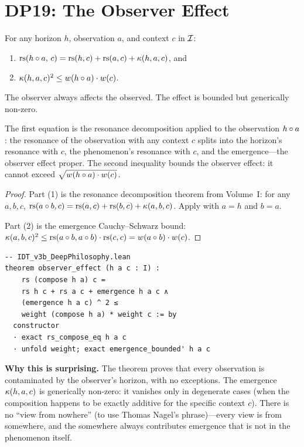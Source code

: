 \section{DP19: The Observer Effect}

\begin{theorem}
\label{thm:observer-effect}
For any horizon $h$, observation $a$, and context $c$ in $\mathcal{I}$:
\begin{enumerate}
\item $\mathrm{rs}(h \circ a,\, c) = \mathrm{rs}(h, c) + \mathrm{rs}(a, c) +
\kappa(h, a, c)$, and
\item $\kappa(h, a, c)^2 \leq w(h \circ a) \cdot w(c)$.
\end{enumerate}
The observer always affects the observed. The effect is bounded but
generically non-zero.
\end{theorem}

The first equation is the resonance decomposition applied to the
observation $h \circ a$: the resonance of the observation with any
context $c$ splits into the horizon's resonance with $c$, the
phenomenon's resonance with $c$, and the emergence---the observer effect
proper. The second inequality bounds the observer effect: it cannot
exceed $\sqrt{w(h \circ a) \cdot w(c)}$.

\begin{proof}
Part (1) is the resonance decomposition theorem from Volume~I:
for any $a, b, c$, $\mathrm{rs}(a \circ b, c) = \mathrm{rs}(a,c) + \mathrm{rs}(b,c) +
\kappa(a,b,c)$. Apply with $a = h$ and $b = a$.

Part (2) is the emergence Cauchy--Schwarz bound:
$\kappa(a,b,c)^2 \leq \mathrm{rs}(a \circ b, a \circ b) \cdot
\mathrm{rs}(c, c) = w(a \circ b) \cdot w(c)$.
\end{proof}

\begin{lstlisting}
-- IDT_v3b_DeepPhilosophy.lean
theorem observer_effect (h a c : I) :
    rs (compose h a) c =
    rs h c + rs a c + emergence h a c ∧
    (emergence h a c) ^ 2 ≤
    weight (compose h a) * weight c := by
  constructor
  · exact rs_compose_eq h a c
  · unfold weight; exact emergence_bounded' h a c
\end{lstlisting}

\begin{surprisebox}
\textbf{Why this is surprising.} The theorem proves that every
observation is contaminated by the observer's horizon, with no
exceptions. The emergence $\kappa(h, a, c)$ is generically non-zero:
it vanishes only in degenerate cases (when the composition happens to
be exactly additive for the specific context $c$). There is no ``view
from nowhere'' (to use Thomas Nagel's phrase)---every view is from
somewhere, and the somewhere always contributes emergence that is
not in the phenomenon itself.
\end{surprisebox}

